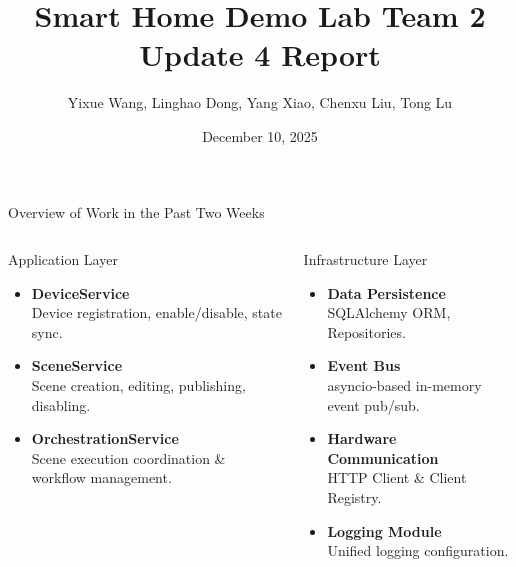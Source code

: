 \documentclass[aspectratio=169, 10pt, xcolor=table]{beamer}
\title[Smart Home Demo Lab Team 2 Update 4 Report]{Smart Home Demo Lab Team 2 Update 4 Report}
\author[Team 2]{Yixue Wang, Linghao Dong, Yang Xiao, Chenxu Liu, Tong Lu}
\date{December 10, 2025}
\begin{document}
\begin{frame}
    \titlepage
\end{frame}

\begin{frame}{Overview of Work in the Past Two Weeks}
    \begin{columns}[t]
            \begin{block}{Application Layer}
                \begin{itemize}[<+->]
                    \item \textbf{DeviceService}\\
                    Device registration, enable/disable, state sync.
                    \item \textbf{SceneService}\\
                    Scene creation, editing, publishing, disabling.
                    \item \textbf{OrchestrationService}\\
                    Scene execution coordination \& workflow management.
                \end{itemize}
            \end{block}

            \pause
            \begin{block}{Infrastructure Layer}
                \begin{itemize}[<+->]
                    \item \textbf{Data Persistence}\\
                    SQLAlchemy ORM, Repositories.
                    \item \textbf{Event Bus}\\
                    asyncio-based in-memory event pub/sub.
                    \item \textbf{Hardware Communication}\\
                    HTTP Client \& Client Registry.
                    \item \textbf{Logging Module}\\
                    Unified logging configuration.
                \end{itemize}
            \end{block}
    \end{columns}
\end{frame}
\end{document}
